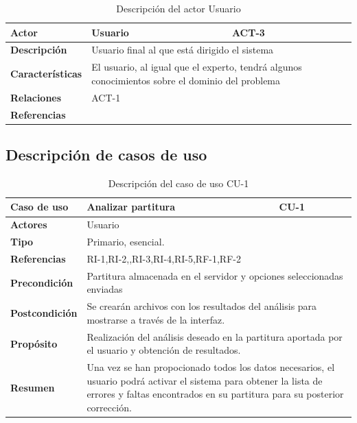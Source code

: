\begin{table}[H]
	\begin{tabular}{@{}|l|p{9cm}|p{2cm}|@{}}
		\hline
		\textbf{Actor} & Usuario & \cellcolor{gray}ACT-3 \\ \hline
		\textbf{Descripción} & \multicolumn{2}{p{11cm}|}{Usuario final al que está dirigido el sistema} \\ \hline
		\textbf{Características} & \multicolumn{2}{p{11cm}|}{El usuario, al igual que el experto, tendrá algunos conocimientos sobre el dominio del problema} \\ \hline
		\textbf{Relaciones} & \multicolumn{2}{p{11cm}|}{ACT-1} \\ \hline
		\textbf{Referencias} & \multicolumn{2}{p{11cm}|}{} \\ \hline
	\end{tabular}
	\caption{Descripción del actor Usuario}
	\label{tablaACT3}
\end{table}

\subsection{Descripción de casos de uso}

\begin{table}[H]
	\begin{tabular}{@{}|l|p{9cm}|p{2cm}|@{}}
		\hline
		\textbf{Caso de uso} & Analizar partitura & \cellcolor{gray}CU-1 \\ \hline
		\textbf{Actores} & \multicolumn{2}{p{11cm}|}{Usuario} \\ \hline 
		\textbf{Tipo} & \multicolumn{2}{p{11cm}|}{Primario, esencial.} \\ \hline
		\textbf{Referencias} & \multicolumn{2}{p{11cm}|}{RI-1,RI-2,,RI-3,RI-4,RI-5,RF-1,RF-2} \\ \hline
		\textbf{Precondición} & \multicolumn{2}{p{11cm}|}{Partitura almacenada en el servidor y opciones seleccionadas enviadas} \\ \hline
		\textbf{Postcondición} & \multicolumn{2}{p{11cm}|}{Se crearán archivos con los resultados del análisis para mostrarse a través de la interfaz.} \\ \hline
		\textbf{Propósito} & \multicolumn{2}{p{11cm}|}{Realización del análisis deseado en la partitura aportada por el usuario y obtención de resultados.} \\ \hline
		\textbf{Resumen} & \multicolumn{2}{p{11cm}|}{Una vez se han propocionado todos los datos necesarios, el usuario podrá activar el sistema para obtener la lista de errores y faltas encontrados en su partitura para su posterior corrección.} \\ \hline
	\end{tabular}
	\caption{Descripción del caso de uso CU-1}
	\label{CU-1}
\end{table}

